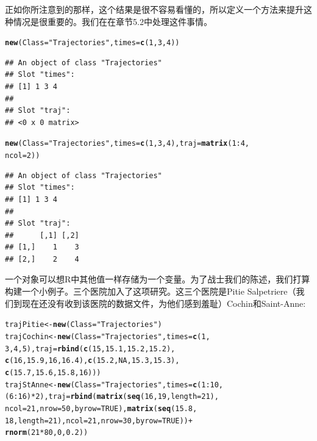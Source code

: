 \documentclass[12pt,a4paper]{article}\usepackage{graphicx, color}
\makeatletter
\newcommand{\hlfunctioncall}[1]{\textcolor[rgb]{0.501960784313725,0,0.329411764705882}{\textbf{#1}}}%
\newcommand{\hlstring}[1]{\textcolor[rgb]{0.6,0.6,1}{#1}}%
\newenvironment{kframe}{%
 \def\at@end@of@kframe{}%
 \ifinner\ifhmode%
  \def\at@end@of@kframe{\end{minipage}}%
  \begin{minipage}{\columnwidth}%
 \fi\fi%
 \def\FrameCommand##1{\hskip\@totalleftmargin \hskip-\fboxsep
 \colorbox{shadecolor}{##1}\hskip-\fboxsep
     \hskip-\linewidth \hskip-\@totalleftmargin \hskip\columnwidth}%
 \MakeFramed {\advance\hsize-\width
   \@totalleftmargin\z@ \linewidth\hsize
   \@setminipage}}%
 {\par\unskip\endMakeFramed%
 \at@end@of@kframe}
\newenvironment{knitrout}{}{} %
\makeatother
\begin{document}
正如你所注意到的那样，这个结果是很不容易看懂的，所以定义一个方法来提升这种情况是很重要的。我们在在章节5.2中处理这件事情。
\begin{knitrout}
\color{fgcolor}\begin{kframe}
\begin{alltt}
\hlfunctioncall{new}(Class = \hlstring{"Trajectories"}, times = \hlfunctioncall{c}(1, 3, 4))
\end{alltt}
\begin{verbatim}
## An object of class "Trajectories"
## Slot "times":
## [1] 1 3 4
## 
## Slot "traj":
## <0 x 0 matrix>
\end{verbatim}
\begin{alltt}
\hlfunctioncall{new}(Class = \hlstring{"Trajectories"}, times = \hlfunctioncall{c}(1, 3, 4), traj = \hlfunctioncall{matrix}(1:4, 
    ncol = 2))
\end{alltt}
\begin{verbatim}
## An object of class "Trajectories"
## Slot "times":
## [1] 1 3 4
## 
## Slot "traj":
##      [,1] [,2]
## [1,]    1    3
## [2,]    2    4
\end{verbatim}
\end{kframe}
\end{knitrout}

一个对象可以想R中其他值一样存储为一个变量。为了战士我们的陈述，我们打算构建一个小例子。三个医院加入了这项研究。这三个医院是Pitie Salpetriere（我们到现在还没有收到该医院的数据文件，为他们感到羞耻）Cochin和Saint-Anne:
\begin{knitrout}
\color{fgcolor}\begin{kframe}
\begin{alltt}
trajPitie <- \hlfunctioncall{new}(Class = \hlstring{"Trajectories"})
trajCochin <- \hlfunctioncall{new}(Class = \hlstring{"Trajectories"}, times = \hlfunctioncall{c}(1, 
    3, 4, 5), traj = \hlfunctioncall{rbind}(\hlfunctioncall{c}(15, 15.1, 15.2, 15.2), 
    \hlfunctioncall{c}(16, 15.9, 16, 16.4), \hlfunctioncall{c}(15.2, NA, 15.3, 15.3), 
    \hlfunctioncall{c}(15.7, 15.6, 15.8, 16)))
trajStAnne <- \hlfunctioncall{new}(Class = \hlstring{"Trajectories"}, times = \hlfunctioncall{c}(1:10, 
    (6:16) * 2), traj = \hlfunctioncall{rbind}(\hlfunctioncall{matrix}(\hlfunctioncall{seq}(16, 19, length = 21), 
    ncol = 21, nrow = 50, byrow = TRUE), \hlfunctioncall{matrix}(\hlfunctioncall{seq}(15.8, 
    18, length = 21), ncol = 21, nrow = 30, byrow = TRUE)) + 
    \hlfunctioncall{rnorm}(21 * 80, 0, 0.2))
\end{alltt}
\end{kframe}
\end{knitrout}
\end{document}
